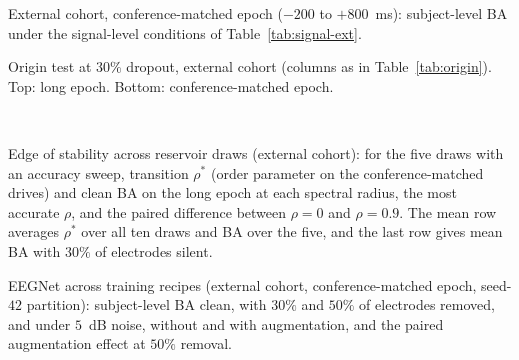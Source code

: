 \documentclass[journal]{IEEEtran}
\begin{document}
\begin{table}[h]
\caption{External cohort, conference-matched epoch ($-200$ to $+800$~ms): subject-level BA under the signal-level conditions of Table~\ref{tab:signal-ext}.}
\label{tab:signal-x}
\centering
\footnotesize
\setlength{\tabcolsep}{2.5pt}

\end{table}

\begin{table}[h]
\caption{Origin test at $30\%$ dropout, external cohort (columns as in Table~\ref{tab:origin}). Top: long epoch. Bottom: conference-matched epoch.}
\label{tab:origin-x}
\centering
\footnotesize
\setlength{\tabcolsep}{1.6pt}
\\[4pt]

\end{table}

\begin{table}[h]
\caption{Edge of stability across reservoir draws (external cohort): for the five draws with an accuracy sweep, transition $\rho^\ast$ (order parameter on the conference-matched drives) and clean BA on the long epoch at each spectral radius, the most accurate $\rho$, and the paired difference between $\rho=0$ and $\rho=0.9$. The mean row averages $\rho^\ast$ over all ten draws and BA over the five, and the last row gives mean BA with $30\%$ of electrodes silent.}
\label{tab:edge-x}
\centering
\footnotesize

\end{table}

\begin{table}[h]
\caption{EEGNet across training recipes (external cohort, conference-matched epoch, seed-$42$ partition): subject-level BA clean, with $30\%$ and $50\%$ of electrodes removed, and under $5$~dB noise, without and with augmentation, and the paired augmentation effect at $50\%$ removal.}
\label{tab:recipes}
\centering
\footnotesize

\end{table}
\end{document}
